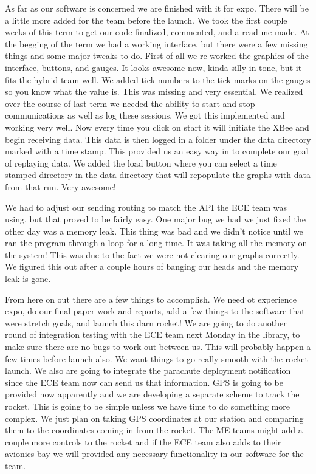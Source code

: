 \documentclass[10pt,draftclsnofoot,onecolumn]{IEEEtran}
\begin{document}
As far as our software is concerned we are finished with it for expo. There will be a little more added for the team before the launch. We took the first couple weeks of this term to get our code finalized, commented, and a read me made. At the begging of the term we had a working interface, but there were a few missing things and some major tweaks to do. First of all we re-worked the graphics of the interface, buttons, and gauges. It looks awesome now, kinda silly in tone, but it fits the hybrid team well. We added tick numbers to the tick marks on the gauges so you know what the value is. This was missing and very essential. We realized over the course of last term we needed the ability to start and stop communications as well as log these sessions. We got this implemented and working very well. Now every time you click on start it will initiate the XBee and begin receiving data. This data is then logged in a folder under the data directory marked with a time stamp. This provided us an easy way in to complete our goal of replaying data. We added the load button where you can select a time stamped directory in the data directory that will repopulate the graphs with data from that run. Very awesome! \par

We had to adjust our sending routing to match the API the ECE team was using, but that proved to be fairly easy. One major bug we had we just fixed the other day was a memory leak. This thing was bad and we didn't notice until we ran the program through a loop for a long time. It was taking all the memory on the system! This was due to the fact we were not clearing our graphs correctly. We figured this out after a couple hours of banging our heads and the memory leak is gone. \par

From here on out there are a few things to accomplish. We need ot experience expo, do our final paper work and reports, add a few things to the software that were stretch goals, and launch this darn rocket! We are going to do another round of integration testing with the ECE team next Monday in the library, to make sure there are no bugs to work out between us. This will probably happen a few times before launch also. We want things to go really smooth with the rocket launch. We also are going to integrate the parachute deployment notification since the ECE team now can send us that information. GPS is going to be provided now apparently and we are developing a separate scheme to track the rocket. This is going to be simple unless we have time to do something more complex. We just plan on taking GPS coordinates at our station and comparing them to the coordinates coming in from the rocket. The ME teams might add a couple more controls to the rocket and if the ECE team also adds to their avionics bay we will provided any necessary functionality in our software for the team. \par
\end{document}
